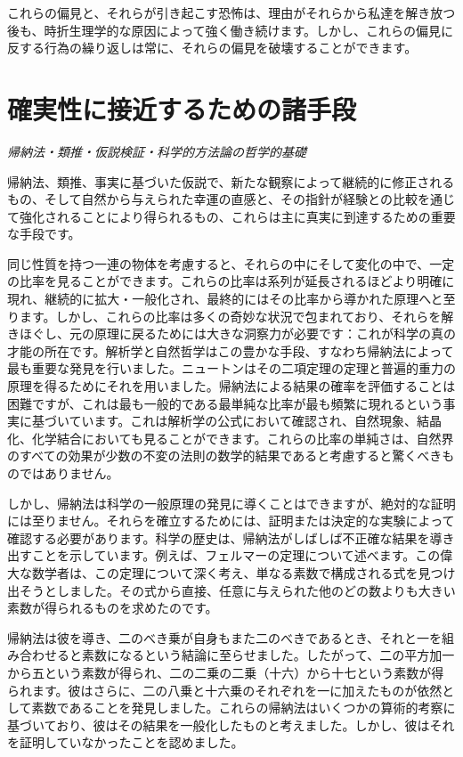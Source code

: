 \documentclass[a4paper,11pt,openany]{ltjsbook}
\begin{document}
これらの偏見と、それらが引き起こす恐怖は、理由がそれらから私達を解き放つ後も、時折生理学的な原因によって強く働き続けます。しかし、これらの偏見に反する行為の繰り返しは常に、それらの偏見を破壊することができます。

\newpage

\chapter{確実性に接近するための諸手段}
\label{ch:xvii}

\begin{center}
\large\textit{帰納法・類推・仮説検証・科学的方法論の哲学的基礎}
\end{center}
\vspace{4mm}

帰納法、類推、事実に基づいた仮説で、新たな観察によって継続的に修正されるもの、そして自然から与えられた幸運の直感と、その指針が経験との比較を通じて強化されることにより得られるもの、これらは主に真実に到達するための重要な手段です。

同じ性質を持つ一連の物体を考慮すると、それらの中にそして変化の中で、一定の比率を見ることができます。これらの比率は系列が延長されるほどより明確に現れ、継続的に拡大・一般化され、最終的にはその比率から導かれた原理へと至ります。しかし、これらの比率は多くの奇妙な状況で包まれており、それらを解きほぐし、元の原理に戻るためには大きな洞察力が必要です：これが科学の真の才能の所在です。解析学と自然哲学はこの豊かな手段、すなわち帰納法によって最も重要な発見を行いました。ニュートンはその二項定理の定理と普遍的重力の原理を得るためにそれを用いました。帰納法による結果の確率を評価することは困難ですが、これは最も一般的である最単純な比率が最も頻繁に現れるという事実に基づいています。これは解析学の公式において確認され、自然現象、結晶化、化学結合においても見ることができます。これらの比率の単純さは、自然界のすべての効果が少数の不変の法則の数学的結果であると考慮すると驚くべきものではありません。

しかし、帰納法は科学の一般原理の発見に導くことはできますが、絶対的な証明には至りません。それらを確立するためには、証明または決定的な実験によって確認する必要があります。科学の歴史は、帰納法がしばしば不正確な結果を導き出すことを示しています。例えば、フェルマーの定理について述べます。この偉大な数学者は、この定理について深く考え、単なる素数で構成される式を見つけ出そうとしました。その式から直接、任意に与えられた他のどの数よりも大きい素数が得られるものを求めたのです。

帰納法は彼を導き、二のべき乗が自身もまた二のべきであるとき、それと一を組み合わせると素数になるという結論に至らせました。したがって、二の平方加一から五という素数が得られ、二の二乗の二乗（十六）から十七という素数が得られます。彼はさらに、二の八乗と十六乗のそれぞれを一に加えたものが依然として素数であることを発見しました。これらの帰納法はいくつかの算術的考察に基づいており、彼はその結果を一般化したものと考えました。しかし、彼はそれを証明していなかったことを認めました。
\end{document}
